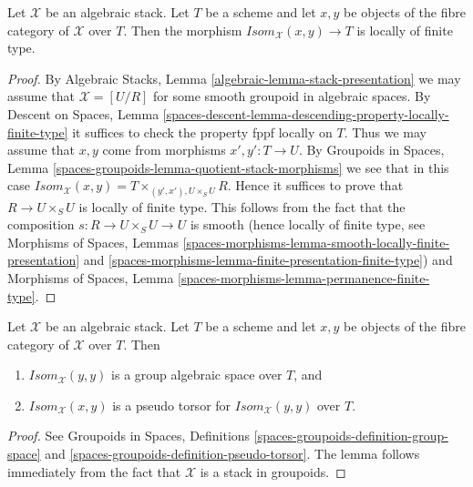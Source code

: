 \begin{lemma}
\label{lemma-isom-locally-finite-type}
Let $\mathcal{X}$ be an algebraic stack.
Let $T$ be a scheme and let $x, y$ be objects of the fibre category of
$\mathcal{X}$ over $T$. Then the morphism
$\mathit{Isom}_\mathcal{X}(x, y) \to T$ is locally of finite type.
\end{lemma}

\begin{proof}
By
Algebraic Stacks, Lemma \ref{algebraic-lemma-stack-presentation}
we may assume that $\mathcal{X} = [U/R]$ for some smooth
groupoid in algebraic spaces.
By
Descent on Spaces,
Lemma \ref{spaces-descent-lemma-descending-property-locally-finite-type}
it suffices to check the property fppf locally on $T$.
Thus we may assume that $x, y$ come from morphisms
$x', y' : T \to U$. By
Groupoids in Spaces,
Lemma \ref{spaces-groupoids-lemma-quotient-stack-morphisms}
we see that in this case
$\mathit{Isom}_\mathcal{X}(x, y) = T \times_{(y', x'), U \times_S U} R$.
Hence it suffices to prove that $R \to U \times_S U$ is
locally of finite type. This follows from the fact that the composition
$s : R \to U \times_S U \to U$ is smooth (hence locally of finite type, see
Morphisms of Spaces, Lemmas
\ref{spaces-morphisms-lemma-smooth-locally-finite-presentation} and
\ref{spaces-morphisms-lemma-finite-presentation-finite-type})
and
Morphisms of Spaces, Lemma \ref{spaces-morphisms-lemma-permanence-finite-type}.
\end{proof}

\begin{lemma}
\label{lemma-isom-pseudo-torsor-aut}
Let $\mathcal{X}$ be an algebraic stack.
Let $T$ be a scheme and let $x, y$ be objects of the fibre category of
$\mathcal{X}$ over $T$. Then
\begin{enumerate}
\item $\mathit{Isom}_\mathcal{X}(y, y)$ is a group algebraic space
over $T$, and
\item $\mathit{Isom}_\mathcal{X}(x, y)$ is a pseudo torsor for
$\mathit{Isom}_\mathcal{X}(y, y)$ over $T$.
\end{enumerate}
\end{lemma}

\begin{proof}
See
Groupoids in Spaces,
Definitions \ref{spaces-groupoids-definition-group-space} and
\ref{spaces-groupoids-definition-pseudo-torsor}.
The lemma follows immediately from the fact that $\mathcal{X}$ is a
stack in groupoids.
\end{proof}

